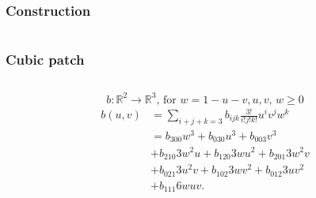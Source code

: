 	\begin{frame}\frametitle{Construction}
		\begin{columns}
			\begin{column}{0.9\textwidth}
				\begin{center}
				\end{center}		
			\end{column}
		\end{columns}
	\end{frame}	

	\begin{frame}\frametitle{Cubic patch}
		\begin{columns}
			\begin{column}{\textwidth}
				\begin{equation*}
					b: \mathbb{R}^2 \rightarrow \mathbb{R}^3 \text{, for } w = 1 - u - v, u, v \text{, } w \geq 0
				\end{equation*}
				\begin{equation*}
					\begin{aligned}
						b(u,v) & = \sum\limits_{i+j+k=3} b_{ijk} \frac{3!}{i!j!k!} u^i v^j w^k\\
						& = b_{300} w^3 + b_{030} u^3 + b_{003} v^3 \\
						& + b_{210} 3 w^2 u + b_{120} 3 w u^2 + b_{201} 3 w^2 v\\
						& + b_{021} 3 u^2 v + b_{102} 3 w v^2 + b_{012} 3 u v^2\\
						& + b_{111} 6 w u v.
 					\end{aligned}
				\end{equation*}
			\end{column}
		\end{columns}
	\end{frame}

